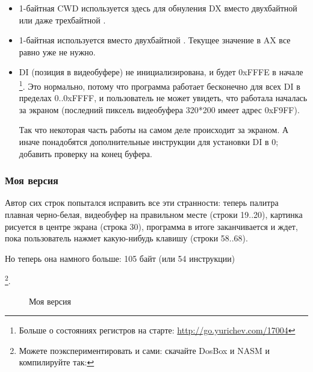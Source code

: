 \begin{itemize}
\item 1-байтная CWD используется здесь для обнуления DX вместо двухбайтной  или даже трехбайтной .

\item 1-байтная  используется вместо двухбайтной 
. 
Текущее значение в AX все равно уже не нужно.

\item DI (позиция в видеобуфере) не инициализирована, и будет 0xFFFE в
начале
\footnote{Больше о состояниях регистров на старте: 
\url{http://go.yurichev.com/17004}}.
Это нормально, потому что программа работает бесконечно для всех DI в пределах 0..0xFFFF, и пользователь
не может увидеть, что работала началась за экраном (последний пиксель видеобуфера 320*200 имеет адрес 0xF9FF).

Так что некоторая часть работы на самом деле происходит за экраном.
А иначе понадобятся дополнительные инструкции для установки DI в 0; добавить проверку на конец буфера.


\end{itemize}

\newcommand{\MyFixedVersion}{Моя  версия}
\subsubsection{\MyFixedVersion}



Автор сих строк попытался исправить все эти странности: теперь палитра плавная черно-белая, видеобуфер на правильном месте
(строки 19..20), картинка рисуется в центре экрана (строка 30), программа в итоге заканчивается и ждет,
пока пользователь нажмет какую-нибудь клавишу (строки 58..68).

Но теперь она намного больше: 105 байт (или 54 инструкции)

\footnote{Можете поэкспериментировать и сами: скачайте DosBox и NASM и компилируйте так:
 
}.

\begin{figure}[H]
\centering
{}
\caption{\MyFixedVersion}
\label{fig:mandelbrot_fixed}
\end{figure}
